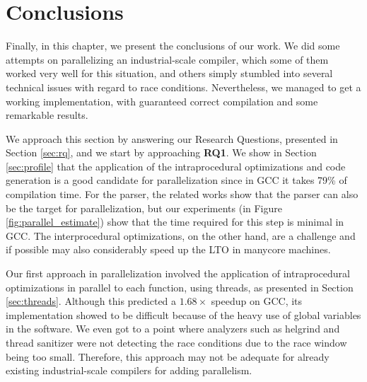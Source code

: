 \chapter{Conclusions}
\label{chap:conclusions}

Finally, in this chapter, we present the conclusions of our work. We did some
attempts on parallelizing an industrial-scale compiler, which some of them
worked very well for this situation, and others simply stumbled into several
technical issues with regard to race conditions.
Nevertheless, we managed to get a working implementation, with guaranteed
correct compilation and some remarkable results.

We approach this section by answering our Research Questions, presented in
Section \ref{sec:rq}, and we start by approaching \textbf{RQ1}. We show in
Section \ref{sec:profile} that the application of the intraprocedural
optimizations and code generation is a good candidate for parallelization since
in GCC it takes 79\% of compilation time.  For the parser, the related works
show that the parser can also be the target for parallelization, but our
experiments (in Figure \ref{fig:parallel_estimate}) show that the time required
for this step is minimal in GCC. The interprocedural optimizations, on the
other hand, are a challenge and if possible may also considerably speed up the
LTO in manycore machines. 


Our first approach in parallelization involved the application of intraprocedural
optimizations in parallel to each function, using threads, as presented in
Section \ref{sec:threads}. Although this
predicted a $1.68\times$ speedup on GCC, its implementation showed to be
difficult because of the heavy use of global variables in the software.  We
even got to a point where analyzers such as helgrind and thread sanitizer were
not detecting the race conditions due to the race window being too small.
Therefore, this approach may not be adequate for already existing
industrial-scale compilers for adding parallelism.

